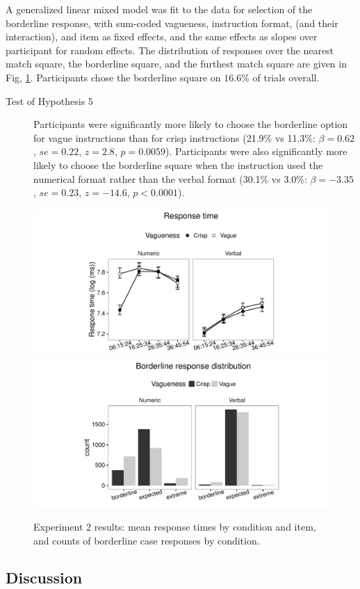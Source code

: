 A generalized linear mixed model \citet{jaeger2008categorical} was fit to the data for selection of the borderline response, with sum-coded vagueness, instruction format, (and their interaction), and item as fixed effects, and the same effects as slopes over participant for random effects. The distribution of responses over the nearest match square, the borderline square, and the furthest match square are given in Fig, \ref{resultse2}. Participants chose the borderline square on $16.6\%$ of trials overall.

\begin{description}
	\item [Test of Hypothesis 5] Participants were significantly more likely to choose the borderline option for vague instructions than for crisp instructions (21.9\% vs 11.3\%: $\beta=0.62$, $se=0.22$, $z=2.8$, $p=0.0059$). Participants were also significantly more likely to choose the borderline square when the instruction used the numerical format rather than the verbal format (30.1\% vs 3.0\%: $\beta=-3.35$, $se=0.23$, $z=-14.6$, $p<0.0001$). 
\end{description}

\begin{figure}[htbp]
\centering
\includegraphics[trim = 20mm 0mm 35mm 0mm, clip, width=.49\textwidth]{figures/e2-rtplot-1.pdf}
\includegraphics[trim = 20mm 0mm 35mm 0mm, clip, width=.49\textwidth]{figures/e2-blBarChart-1}
\caption{Experiment 2 results: mean response times by condition and item, and counts of borderline case responses by condition.}
\label{resultse2}
\end{figure}

\subsection{Discussion}

